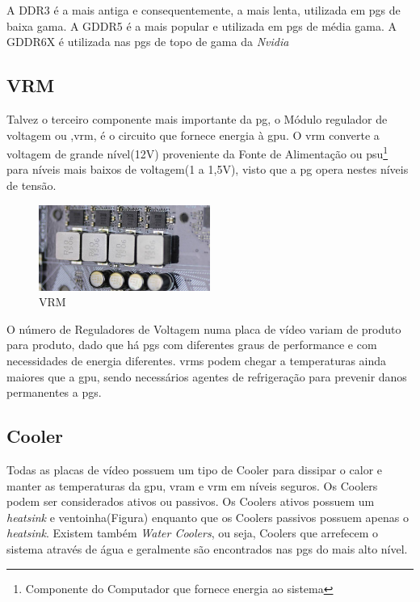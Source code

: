 \documentclass{report}
\begin{document}
A DDR3 é a mais antiga e consequentemente, a mais lenta, utilizada em \acp{pg} de baixa gama. A GDDR5 é a mais popular e utilizada em \acp{pg} de média gama. A GDDR6X é utilizada nas \acp{pg} de topo de gama da \textit{Nvidia}
\clearpage
\subsection{VRM}
\label{sec.vrm}
Talvez o terceiro componente mais importante da \ac{pg}, o Módulo regulador de voltagem ou ,\ac{vrm}, é o circuito que fornece energia à \ac{gpu}. O \ac{vrm} converte a voltagem de grande nível(12V) proveniente da Fonte de Alimentação ou \ac{psu}\footnote{Componente do Computador que fornece energia ao sistema} para níveis mais baixos de voltagem(1 a 1,5V), visto que a \ac{pg} opera nestes níveis de tensão.
\begin{figure}[h]
\centering
\includegraphics[width=0.5\textwidth]{vrm.jpg}
\caption{VRM}
\label{fig:vrm}
\end{figure}

O número de Reguladores de Voltagem numa placa de vídeo variam de produto para produto, dado que há \acp{pg} com diferentes graus de performance e com necessidades de energia diferentes. \acp{vrm} podem chegar a temperaturas ainda maiores que a \ac{gpu}, sendo necessários agentes de refrigeração para prevenir danos permanentes a \acp{pg}.


\clearpage
\subsection{Cooler}
\label{sec.cooler}

Todas as placas de vídeo possuem um tipo de Cooler para dissipar o calor e manter as temperaturas da \ac{gpu}, \ac{vram} e \ac{vrm} em níveis seguros. Os Coolers podem ser considerados ativos ou passivos. Os Coolers ativos possuem um \textit{heatsink} e ventoinha(Figura) enquanto que os Coolers passivos possuem apenas o \textit{heatsink}. Existem também \textit{Water Coolers}, ou seja, Coolers que arrefecem o sistema através de água e geralmente são encontrados nas \acp{pg} do mais alto nível.
\end{document}
